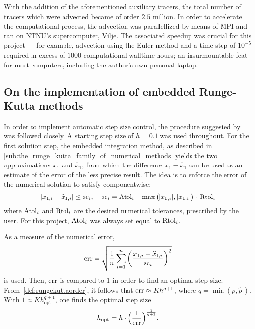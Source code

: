 With the addition of the aforementioned auxiliary tracers, the total number
of tracers which were advected became of order $2.5$ million. In order to
accelerate the computational process, the advection was parallellized by means
of MPI and ran on NTNU's supercomputer, Vilje. The associated speedup was
crucial for this project --- for example, advection using the Euler method
and a time step of $10^{-5}$ required in excess of $1000$ computational
walltime hours; an insurmountable feat for most computers, including the
author's own personal laptop.

\subsection{On the implementation of embedded Runge-Kutta methods}
\label{sub:on_the_implementation_of_embedded_runge_kutta_methods}

In order to implement automatic step size control, the procedure suggested
by \textcite[pp.167--168]{hairer1993solving} was followed
closely. A starting step size of $h=0.1$ was used throughout. For the first
solution step, the embedded integration method, as described in
\cref{sub:the_runge_kutta_family_of_numerical_methods} yields the two
approximations $x_{1}$ and $\widehat{x}_{1}$, from which the difference
$x_{1}-\widehat{x}_{1}$ can be used as an estimate of the error of the less
precise result. The idea is to enforce the error of the numerical solution to
satisfy componentwise:
\begin{equation}
    \label{eq:embeddederror}
    \abs{x_{1,i}-\widehat{x}_{1,i}} \leq \scem_{i},\quad{}%
    \scem_{i}=\atol_{i}+\max\big(\abs{x_{0,i}},\abs{x_{1,i}}\big)\cdot{}\rtol_{i}
\end{equation}
where $\operatorname{Atol}_{i}$ and $\operatorname{Rtol}_{i}$ are the desired numerical tolerances, prescribed
by the user. For this project, $\operatorname{Atol}_{i}$ was always set equal to $\operatorname{Rtol}_{i}$.

As a measure of the numerical error,
\begin{equation}
    \label{eq:embeddednumericalerror}
    \errem = \sqrt{\frac{1}{n}\sum\limits_{i=1}^{n}%
    {\bigg(\frac{x_{1,i}-\widehat{x}_{1,i}}{\scem_{i}}\bigg)}^{2}}
\end{equation}
is used. Then, $\operatorname{err}$ is compared to $1$ in order to find an optimal step
size. From~\cref{def:rungekuttaorder}, it follows that $\operatorname{err}\approx{}Kh^{q+1}$,
where $q=\min(p,\widehat{p}\,)$. With $1\approx{}Kh_{\mathrm{opt}}^{q+1}$,
one finds the optimal step size
\begin{equation}
    \label{eq:embeddedoptimalstepsize}
    h_{\mathrm{opt}}=h\cdot\Big(\frac{1}{\operatorname{err}}\Big)^{\frac{1}{q+1}}.
\end{equation}

